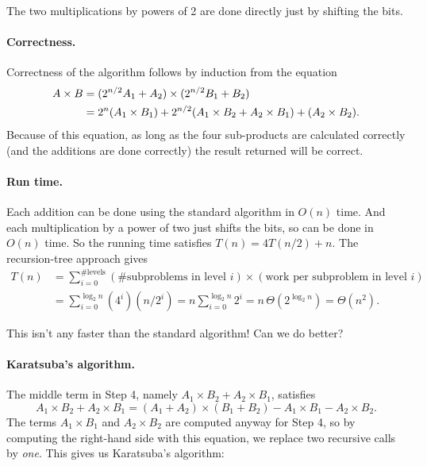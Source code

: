 The two multiplications by powers of 2 are done directly just by shifting the bits.

\paragraph{Correctness.}
Correctness of the algorithm follows by induction from the equation
\begin{align}
  A\times B & = (2^{n/2} A_1 + A_2)\times (2^{n/2} B_1 + B_2) \notag\\
            & = 2^{n} (A_1 \times B_1)
              + 2^{n/2}(A_1 \times B_2 + A_2 \times B_1)
              + (A_2\times B_2).
              \label{dc: kar 1}
\end{align}
Because of this equation, as long as the four sub-products are calculated correctly
(and the additions are done correctly)
the result returned will be correct.

\paragraph{Run time.}
Each addition can be done using the standard algorithm in $O(n)$ time.
And each multiplication by a power of two just shifts the bits,
so can be done in $O(n)$ time.
So the running time satisfies $T(n) = 4 T(n/2) + n$.
The recursion-tree approach gives
\begin{align*}
  T(n)
  & {} = \sum_{i=0}^{\text{\#levels}} (\text{\# subproblems in level } i)
    \times (\text{work per subproblem in level } i) \\
  & {} = \sum_{i=0}^ {\log_2 n} (4^i) (n/2^i)
  = n \sum_{i=0}^{\log_2 n} 2^i
  = n\, \Theta(2^{\log_2 n})
  = \Theta(n^2).
\end{align*}

This isn't any faster than the standard algorithm!  Can we do better?

\paragraph{Karatsuba's algorithm.}
The middle term in Step 4, namely $A_1\times B_2 + A_2 \times B_1$, satisfies
\begin{equation}\label{dc: kar 2}
  A_1\times B_2 + A_2 \times B_1
  = (A_1 + A_2)\times (B_1 + B_2) - A_1\times B_1 - A_2 \times B_2.
\end{equation}
The terms $A_1\times B_1$ and $A_2 \times B_2$ are computed anyway
for Step 4, so by computing the right-hand side with this equation,
we replace two recursive calls by \emph{one}.
This gives us Karatsuba's algorithm:

